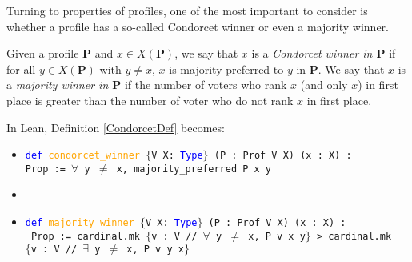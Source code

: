 \documentclass[runningheads]{llncs}
\begin{document}
Turning to properties of profiles, one of the most important to consider is whether a profile has a so-called Condorcet winner or even a majority winner.

\begin{definition}\label{CondorcetDef} \textnormal{Given a profile $\mathbf{P}$ and $x\in X(\mathbf{P})$, we say that $x$ is a \textit{Condorcet winner in $\mathbf{P}$} if for all $y\in X(\mathbf{P})$ with $y\neq x$, $x$ is majority preferred to $y$ in $\mathbf{P}$. We say that $x$ is a \textit{majority winner in $\mathbf{P}$} if the number of voters who rank $x$ (and only $x$) in first place is greater than the number of voter who do not rank $x$ in first place.}
\end{definition}
In Lean, Definition \ref{CondorcetDef} becomes:

\begin{itemize}
\item[] \texttt{\textcolor{blue}{def} \textcolor{orange}{condorcet\_winner} $\{$V X: \textcolor{blue}{Type}$\}$ (P : Prof V X) (x : X) :} \\ \texttt{Prop := $\forall$ y $\neq$ x, majority\_preferred P x y}
\item[]
\item[] \texttt{\textcolor{blue}{def} \textcolor{orange}{majority\_winner} $\{$V X: \textcolor{blue}{Type}$\}$ (P : Prof V X) (x : X) :} \\
\texttt{ Prop := cardinal.mk $\{$v : V // $\forall$ y $\neq$ x, P v x y$\}$ > cardinal.mk} \\ \texttt{$\{$v : V // $\exists$ y $\neq$ x, P v y x$\}$}
\end{itemize}
\end{document}
